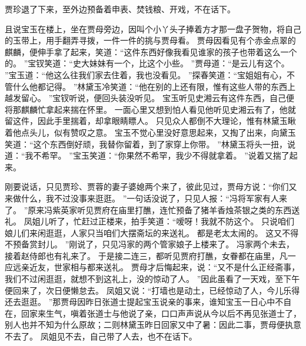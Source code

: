 贾珍退了下来，至外边预备着申表、焚钱粮、开戏，不在话下。
\par
且说宝玉在楼上，坐在贾母旁边，因叫个小丫头子捧着方才那一盘子贺物，将自己的玉带上，用手翻弄寻拨，一件一件的挑与贾母看。
贾母因看见有个赤金点翠的麒麟，便伸手拿了起来，笑道：“这件东西好像我看见谁家的孩子也带着这么一个的。
”宝钗笑道：“史大妹妹有一个，比这个小些。
”贾母道：“是云儿有这个。
”宝玉道：“他这么往我们家去住着，我也没看见。
”探春笑道：“宝姐姐有心，不管什么他都记得。
”林黛玉冷笑道：“他在别的上还有限，惟有这些人带的东西上越发留心。
”宝钗听说，便回头装没听见。
宝玉听见史湘云有这件东西，自己便将那麒麟忙拿起来揣在怀里。
一面心里又想到怕人看见他听见史湘云有了，他就留这件，因此手里揣着，却拿眼睛瞟人。
只见众人都倒不大理论，惟有林黛玉瞅着他点头儿，似有赞叹之意。
宝玉不觉心里没好意思起来，又掏了出来，向黛玉笑道：“这个东西倒好顽，我替你留着，到了家穿上你带。
”林黛玉将头一扭，说道：“我不希罕。
”宝玉笑道：“你果然不希罕，我少不得就拿着。
”说着又揣了起来。
\par
刚要说话，只见贾珍、贾蓉的妻子婆媳两个来了，彼此见过，贾母方说：“你们又来做什么，我不过没事来逛逛。
”一句话没说了，只见人报：“冯将军家有人来了。
”原来冯紫英家听见贾府在庙里打醮，连忙预备了猪羊香烛茶银之类的东西送礼。
凤姐儿听了，忙赶过正楼来，拍手笑道：“嗳呀！我就不防这个。
只说咱们娘儿们来闲逛逛，人家只当咱们大摆斋坛的来送礼。
都是老太太闹的。
这又不得不预备赏封儿。
”刚说了，只见冯家的两个管家娘子上楼来了。
冯家两个未去，接着赵侍郎也有礼来了。
于是接二连三，都听见贾府打醮，女眷都在庙里，凡一应远亲近友，世家相与都来送礼。
贾母才后悔起来，说：“又不是什么正经斋事，我们不过闲逛逛，就想不到这礼上，没的惊动了人。
”因此虽看了一天戏，至下午便回来了，次日便懒怠去。
凤姐又说：“打墙也是动土，已经惊动了人，今儿乐得还去逛逛。
”那贾母因昨日张道士提起宝玉说亲的事来，谁知宝玉一日心中不自在，回家来生气，嗔着张道士与他说了亲，口口声声说从今以后不再见张道士了，别人也并不知为什么原故；二则林黛玉昨日回家又中了暑：因此二事，贾母便执意不去了。
凤姐见不去，自己带了人去，也不在话下。
